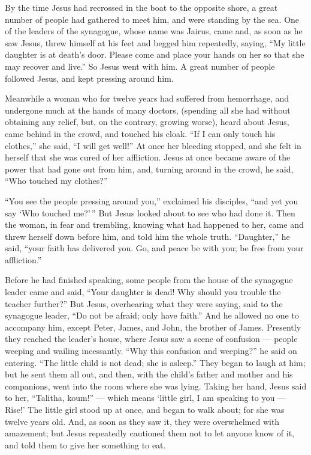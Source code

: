  By the time Jesus had recrossed in the boat to the
opposite shore, a great number of people had gathered to meet him, and
were standing by the sea.  One of the leaders of the
synagogue, whose name was Jairus, came and, as soon as he saw Jesus,
threw himself at his feet and begged him repeatedly, 
saying, ``My little daughter is at death's door. Please come and place
your hands on her so that she may recover and live.''  So
Jesus went with him. A great number of people followed Jesus, and kept
pressing around him.

 Meanwhile a woman who for twelve years had suffered from
hemorrhage,  and undergone much at the hands of many
doctors, (spending all she had without obtaining any relief, but, on the
contrary, growing worse),  heard about Jesus, came behind
in the crowd, and touched his cloak.  ``If I can only touch
his clothes,'' she said, ``I will get well!''  At once her
bleeding stopped, and she felt in herself that she was cured of her
affliction.  Jesus at once became aware of the power that
had gone out from him, and, turning around in the crowd, he said, ``Who
touched my clothes?''

 ``You see the people pressing around you,'' exclaimed his
disciples, ``and yet you say `Who touched me?'\,''  But
Jesus looked about to see who had done it.  Then the woman,
in fear and trembling, knowing what had happened to her, came and threw
herself down before him, and told him the whole truth. 
``Daughter,'' he said, ``your faith has delivered you. Go, and peace be
with you; be free from your affliction.''

 Before he had finished speaking, some people from the
house of the synagogue leader came and said, ``Your daughter is dead!
Why should you trouble the teacher further?''  But Jesus,
overhearing what they were saying, said to the synagogue leader, ``Do
not be afraid; only have faith.''  And he allowed no one to
accompany him, except Peter, James, and John, the brother of James.
 Presently they reached the leader's house, where Jesus saw
a scene of confusion --- people weeping and wailing incessantly.
 ``Why this confusion and weeping?'' he said on entering.
``The little child is not dead; she is asleep.''  They
began to laugh at him; but he sent them all out, and then, with the
child's father and mother and his companions, went into the room where
she was lying.  Taking her hand, Jesus said to her,
``Talitha, koum!'' --- which means `little girl, I am speaking to you
--- Rise!'  The little girl stood up at once, and began to
walk about; for she was twelve years old. And, as soon as they saw it,
they were overwhelmed with amazement;  but Jesus repeatedly
cautioned them not to let anyone know of it, and told them to give her
something to eat.

